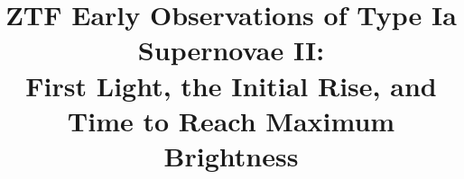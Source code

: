 \documentclass[twocolumn]{aastex63}
\begin{document}
\title{ZTF Early Observations of Type Ia  Supernovae II: \\ First Light, the Initial Rise, and Time to Reach Maximum Brightness}


\end{document}
